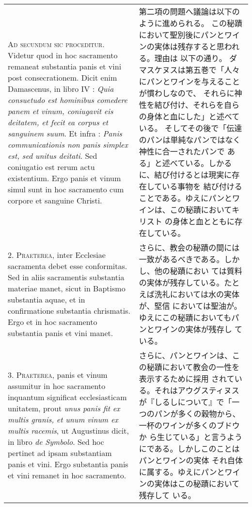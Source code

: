 \documentclass[10pt]{jsarticle} %
\begin{document}
\begin{longtable}{p{21em}p{21em}}

{\scshape Ad secundum sic proceditur}. Videtur quod in hoc sacramento remaneat
substantia panis et vini post consecrationem. Dicit enim Damascenus,
in libro IV : {\itshape Quia consuetudo est hominibus comedere panem et vinum,
coniugavit eis deitatem, et fecit ea corpus et sanguinem suum}. Et
infra : {\itshape Panis communicationis non panis simplex est, sed unitus
deitati}. Sed coniugatio est rerum actu existentium. Ergo panis et
vinum simul sunt in hoc sacramento cum corpore et sanguine Christi.

&

第二項の問題へ議論は以下のように進められる。
この秘蹟において聖別後にパンとワインの実体は残存すると思われる。理由は
 以下の通り。
ダマスケヌスは第五巻で「人々にパンとワインを与えることが慣わしなので、
 それらに神性を結び付け、それらを自らの身体と血にした」と述べている。
 そしてその後で「伝達のパンは単純なパンではなく神性に合一されたパンで
 ある」と述べている。しかるに、結び付けるとは現実に存在している事物を
 結び付けることである。ゆえにパンとワインは、この秘蹟においてキリスト
 の身体と血とともに存在している。


\\



2. {\scshape Praeterea}, inter Ecclesiae sacramenta debet esse conformitas. Sed in
aliis sacramentis substantia materiae manet, sicut in Baptismo
substantia aquae, et in confirmatione substantia chrismatis. Ergo et
in hoc sacramento substantia panis et vini manet.

&

さらに、教会の秘蹟の間には一致があるべきである。しかし、他の秘蹟におい
 ては質料の実体が残存している。たとえば洗礼においては水の実体が、堅信
 においては聖油が。ゆえにこの秘蹟においてもパンとワインの実体が残存し
 ている。


\\



3. {\scshape Praeterea}, panis et vinum assumitur in hoc sacramento inquantum
significat ecclesiasticam unitatem, prout {\itshape unus panis fit ex multis
granis, et unum vinum ex multis racemis}, ut Augustinus dicit, in libro
{\itshape de Symbolo}. Sed hoc pertinet ad ipsam substantiam panis et vini. Ergo
substantia panis et vini remanet in hoc sacramento.

&


さらに、パンとワインは、この秘蹟において教会の一性を表示するために採用
 されている。それはアウグスティヌスが『しるしについて』で「一つのパンが多くの穀物から、一杯のワインが多くのブドウか
 ら生じている」と言うようにである。しかしこのことはパンとワインの実体
 それ自体に属する。ゆえにパンとワインの実体はこの秘蹟において残存して
 いる。


\end{longtable}
\end{document}
